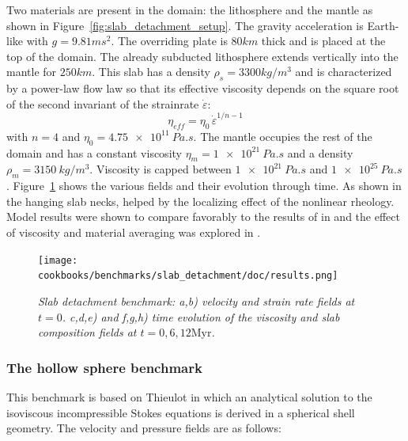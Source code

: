 \documentclass{article}
\begin{document}
Two materials are present in the domain: the lithosphere and the mantle as shown
in Figure~\ref{fig:slab_detachment_setup}. The gravity acceleration
is Earth-like with $g=9.81 \si{m}\si{s}^2$.
The overriding plate is $80\si{km}$ thick and is placed at the top of the domain.
The already subducted lithosphere extends vertically into the mantle for $250 \si{km}$.
This slab has a density $\rho_s=3300\si{kg}/\si{m}^3$ and is characterized by a power-law flow law so that
its effective viscosity depends on the square root of the second invariant
of the strainrate $\dot\varepsilon$:
\[
\eta_{eff} = \eta_0 \, \dot\varepsilon^{1/n-1}
\]
with $n=4$ and $\eta_0=\SI{4.75e11}{Pa . s}$.
The mantle occupies the rest of the domain and has a constant viscosity $\eta_m=\SI{1e21}{Pa . s}$
and a density $\rho_m=\SI{3150}{kg/m^3}$. Viscosity is capped between $\SI{1e21}{Pa . s}$ and $\SI{1e25}{Pa . s}$.
Figure~\ref{fig:slab_detachment_evolution} shows the various fields and their evolution through time.
As shown in \cite{schm11,gltf18} the hanging slab necks, helped by the localizing effect of the
nonlinear rheology. Model results were shown to compare favorably to the results of \cite{schm11} in \cite{gltf18,hitg14}
and the effect of viscosity and material averaging was explored in \cite{gltf18}.

\begin{figure}
\centering
\texttt{[image: cookbooks/benchmarks/slab\_detachment/doc/results.png]}
\caption{\it Slab detachment benchmark: a,b) velocity and strain rate fields at $t=0$.
c,d,e) and f,g,h) time evolution of the viscosity and slab composition fields at $t=0, 6, 12\text{Myr}$.
\label{fig:slab_detachment_evolution}}
\end{figure}

\subsubsection{The hollow sphere benchmark}

\label{sec:cookbooks-hollow-sphere}

This benchmark is based on Thieulot \cite{THIE17} in which an analytical solution to the
isoviscous incompressible Stokes equations is derived in a spherical shell geometry.
The velocity and pressure fields are as follows:
\end{document}
